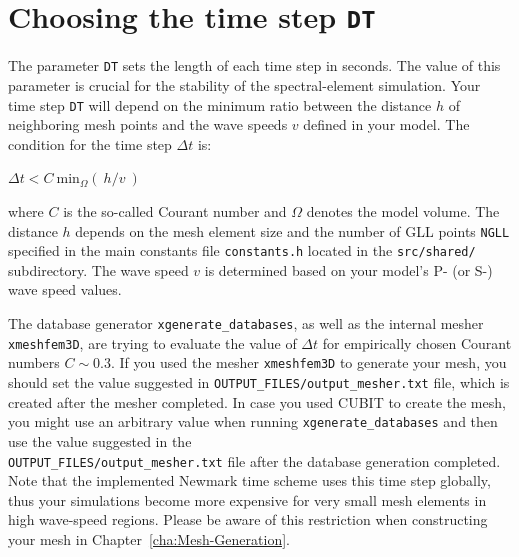 \section{Choosing the time step \texttt{DT}}\label{sec:Choosing-the-Time-Step}

The parameter \texttt{DT} sets the length of each time step in seconds.
The value of this parameter is crucial for the stability of the spectral-element
simulation. Your time step \texttt{DT} will depend on the minimum
ratio between the distance $h$ of neighboring mesh points and the
wave speeds $v$ defined in your model. The condition for the time
step $\Delta t$ is:
\begin{lyxcode}
$\Delta t<C~\mathrm{min}_{\Omega}(~h/v~)$
\end{lyxcode}
where $C$ is the so-called Courant number and $\Omega$ denotes the
model volume. The distance $h$ depends on the mesh element size and
the number of GLL points \texttt{NGLL} specified in the main constants
file \texttt{constants.h} located in the \texttt{src/shared/} subdirectory.
The wave speed $v$ is determined based on your model's P- (or S-)
wave speed values.

The database generator \texttt{xgenerate\_databases}, as well as the
internal mesher \texttt{xmeshfem3D}, are trying to evaluate the value
of $\Delta t$ for empirically chosen Courant numbers $C\sim0.3$.
If you used the mesher \texttt{xmeshfem3D} to generate your mesh,
you should set the value suggested in \texttt{OUTPUT\_FILES/output\_mesher.txt}
file, which is created after the mesher completed. In case you used
CUBIT to create the mesh, you might use an arbitrary value when running
\texttt{xgenerate\_databases} and then use the value suggested in
the ~\\
 \texttt{OUTPUT\_FILES/output\_mesher.txt} file after the database
generation completed. Note that the implemented Newmark time scheme
uses this time step globally, thus your simulations become more expensive
for very small mesh elements in high wave-speed regions. Please be
aware of this restriction when constructing your mesh in Chapter~\ref{cha:Mesh-Generation}.

